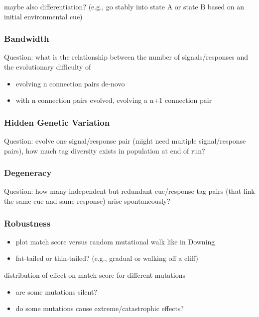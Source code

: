 maybe also differentiation?
(e.g., go stably into state A or state B based on an initial environmental cue)

\subsubsection{Bandwidth}

Question: what is the relationship between the number of signals/responses and the evolutionary difficulty of
\begin{itemize}
\item evolving n connection pairs de-novo
\item with n connection pairs evolved, evolving a n+1 connection pair
\end{itemize}

\subsubsection{Hidden Genetic Variation}

Question: evolve one signal/response pair (might need multiple signal/response pairs), how much tag diversity exists in population at end of run?

\subsubsection{Degeneracy}

Question: how many independent but redundant cue/response tag pairs (that link the same cue and same response) arise spontaneously?

\subsubsection{Robustness}

\begin{itemize}
\item plot match score versus random mutational walk like in Downing
\item fat-tailed or thin-tailed? (e.g., gradual or walking off a cliff)
\end{itemize}

distribution of effect on match score for different mutations
\begin{itemize}
\item are some mutations silent?
\item do some mutations cause extreme/catastrophic effects?
\end{itemize}


